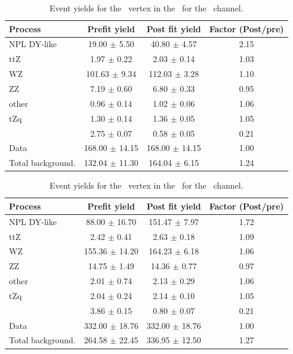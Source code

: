 \begin{table}[htbp]
	\centering
	\caption{Event yields for the \Zut\ vertex in the \WZCR\  for the \eemu\ channel. }
	\begin{tabular} {l c c c }
		\toprule
		Process & Prefit yield & Post fit yield & Factor (Post/pre) \\
		\midrule
		NPL DY-like & 19.00 $ \pm $ 5.50 & 40.80 $ \pm $ 4.57 & 2.15 \\ 
		ttZ & 1.97 $ \pm $ 0.22 & 2.03 $ \pm $ 0.14 & 1.03 \\ 
		WZ & 101.63 $ \pm $ 9.34 & 112.03 $ \pm $ 3.28 & 1.10 \\ 
		ZZ & 7.19 $ \pm $ 0.60 & 6.80 $ \pm $ 0.33 & 0.95 \\ 
		other & 0.96 $ \pm $ 0.14 & 1.02 $ \pm $ 0.06 & 1.06 \\ 
		tZq & 1.30 $ \pm $ 0.14 & 1.36 $ \pm $ 0.05 & 1.05 \\ 
		\kZut  & 2.75 $ \pm $ 0.07 & 0.58 $ \pm $ 0.05 & 0.21\\
		\hdashline
		Data & 168.00 $ \pm $ 14.15 & 168.00 $ \pm $ 14.15 & 1.00\\
		Total background. & 132.04 $ \pm $ 11.30 & 164.04 $ \pm $ 6.15 & 1.24\\
		\bottomrule
	\end{tabular}
\end{table}
\begin{table}[htbp]
	\centering
	\caption{Event yields for the \Zut\ vertex in the \WZCR\  for the \emumu\ channel. }
	\begin{tabular} {l c c c }
		\toprule
		Process & Prefit yield & Post fit yield & Factor (Post/pre) \\
		\midrule
		NPL DY-like & 88.00 $ \pm $ 16.70 & 151.47 $ \pm $ 7.97 & 1.72 \\ 
		ttZ & 2.42 $ \pm $ 0.41 & 2.63 $ \pm $ 0.18 & 1.09 \\ 
		WZ & 155.36 $ \pm $ 14.20 & 164.23 $ \pm $ 6.18 & 1.06 \\ 
		ZZ & 14.75 $ \pm $ 1.49 & 14.36 $ \pm $ 0.77 & 0.97 \\ 
		other & 2.01 $ \pm $ 0.74 & 2.13 $ \pm $ 0.29 & 1.06 \\ 
		tZq & 2.04 $ \pm $ 0.24 & 2.14 $ \pm $ 0.10 & 1.05 \\ 
		\kZut  & 3.86 $ \pm $ 0.15 & 0.80 $ \pm $ 0.07 & 0.21\\
		\hdashline
		Data & 332.00 $ \pm $ 18.76 & 332.00 $ \pm $ 18.76 & 1.00\\
		Total background. & 264.58 $ \pm $ 22.45 & 336.95 $ \pm $ 12.50 & 1.27\\
		\bottomrule
	\end{tabular}
\end{table}

